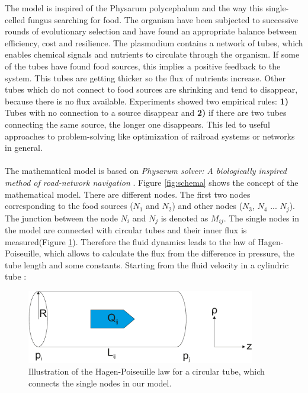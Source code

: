 \documentclass[11pt]{scrartcl}
\begin{document}
The model is inspired of the Physarum polycephalum and the way this single-celled fungus searching for food. The organism have been subjected to successive rounds of evolutionary selection and have found an appropriate balance between efficiency, cost and resilience. The plasmodium contains a network of tubes, which enables chemical signals and nutrients to circulate through the organism. If some of the tubes have found food sources, this implies a positive feedback to the system. This tubes are getting thicker so the flux of nutrients increase. Other tubes which do not connect to food sources are shrinking and tend to disappear, because there is no flux available. Experiments showed two empirical rules: \textbf{1)} Tubes with no connection to a source disappear and \textbf{2)} if there are two tubes connecting the same source, the longer one disappears. This led to useful approaches to problem-solving like optimization of railroad systems or networks in general.~\\
~\\
The mathematical model is based on \textit{Physarum solver: A biologically inspired method of road-network navigation} \cite{network_model}. Figure \ref{fig:schema} shows the concept of the mathematical model. There are different nodes. The first two nodes corresponding to the food sources ($N_1$ and $N_2$) and other nodes ($N_3$, $N_4$ ... $N_j$). The junction between the node $N_i$ and $N_j$ is denoted as $M_{ij}$. The single nodes in the model are connected with circular tubes and their inner flux is measured(Figure \ref{fig:fluidd}). Therefore the fluid dynamics leads to the law of Hagen-Poiseuille, which allows to calculate the flux from the difference in pressure, the tube length and some constants. Starting from the fluid velocity in a cylindric tube \cite{kirb2010}:
\begin{figure}[H]
	\centering
	\includegraphics[width=10cm]{figures/figure2}
	\caption{Illustration of the Hagen-Poiseuille law for a circular tube, which connects the single nodes in our model.}
	\label{fig:fluidd}
\end{figure}
\end{document}
